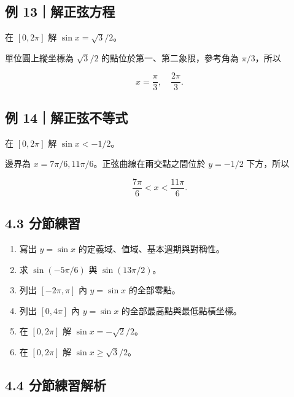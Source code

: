 \documentclass[11pt,a4paper]{article}
\providecommand{\tightlist}{%
  \setlength{\itemsep}{0pt}\setlength{\parskip}{0pt}}
\begin{document}
\subsection{例 13｜解正弦方程}\label{ux4f8b-13ux89e3ux6b63ux5f26ux65b9ux7a0b}

在 \([0,2\pi]\) 解 \(\sin x=\sqrt3/2\)。

單位圓上縱坐標為 \(\sqrt3/2\) 的點位於第一、第二象限，參考角為 \(\pi/3\)，所以

\[
x=\frac\pi3,\quad\frac{2\pi}{3}.
\]

\subsection{例 14｜解正弦不等式}\label{ux4f8b-14ux89e3ux6b63ux5f26ux4e0dux7b49ux5f0f}

在 \([0,2\pi]\) 解 \(\sin x<-1/2\)。

邊界為 \(x=7\pi/6,11\pi/6\)。正弦曲線在兩交點之間位於 \(y=-1/2\) 下方，所以

\[
\frac{7\pi}{6}<x<\frac{11\pi}{6}.
\]

\subsection{4.3 分節練習}\label{ux5206ux7bc0ux7df4ux7fd2-3}

\begin{enumerate}
\def\labelenumi{\arabic{enumi}.}
\tightlist
\item
  寫出 \(y=\sin x\) 的定義域、值域、基本週期與對稱性。
\item
  求 \(\sin(-5\pi/6)\) 與 \(\sin(13\pi/2)\)。
\item
  列出 \([-2\pi,\pi]\) 內 \(y=\sin x\) 的全部零點。
\item
  列出 \([0,4\pi]\) 內 \(y=\sin x\) 的全部最高點與最低點橫坐標。
\item
  在 \([0,2\pi]\) 解 \(\sin x=-\sqrt2/2\)。
\item
  在 \([0,2\pi]\) 解 \(\sin x\ge\sqrt3/2\)。
\end{enumerate}

\subsection{4.4 分節練習解析}\label{ux5206ux7bc0ux7df4ux7fd2ux89e3ux6790-3}
\end{document}

